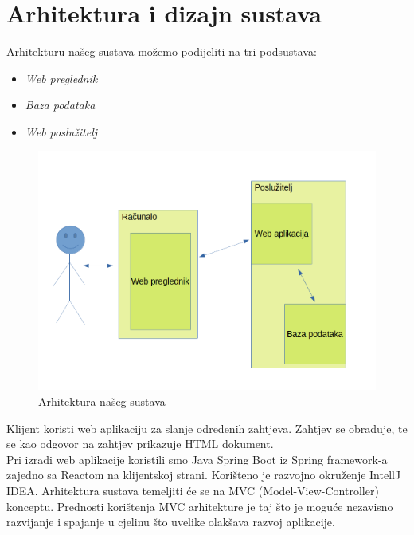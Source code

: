 \chapter{Arhitektura i dizajn sustava}
		
		Arhitekturu našeg sustava možemo podijeliti na tri podsustava:	
		\begin{itemize}
		\item 	\textit{Web preglednik}
		\item 	\textit{Baza podataka}
		\item 	\textit{Web poslužitelj}		
		\end{itemize}
		
		\begin{figure}[H]
			\centering
			\includegraphics[width=\textwidth, scale=2.0]{slike/arhitektura.png}
			\caption{Arhitektura našeg sustava}
			\label{fig:arhitektura}
		\end{figure}
\eject
	
	
	
	{Klijent koristi web aplikaciju za slanje određenih zahtjeva. Zahtjev se obrađuje, te se kao odgovor na zahtjev prikazuje HTML dokument.}
	\\
	{Pri izradi web aplikacije koristili smo Java Spring Boot iz Spring framework-a zajedno sa Reactom na klijentskoj strani. Korišteno je razvojno okruženje IntellJ IDEA.}
	{Arhitektura sustava temeljiti će se na MVC (Model-View-Controller) konceptu. Prednosti korištenja MVC arhitekture je taj što je moguće nezavisno razvijanje i spajanje u cjelinu što uvelike olakšava razvoj aplikacije.}
	
